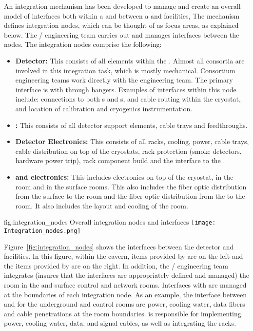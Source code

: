 An integration mechanism has been developed to manage and create an
overall model of interfaces both within a  and
between a  and facilities, The mechanism defines
integration nodes, which can be thought of as focus areas, as
explained below.  The / engineering team carries out and
manages interfaces between the nodes. The integration nodes comprise the following:
\begin{itemize}
\item {\bf Detector:} This consists of all  elements within
  the . Almost all consortia are involved in this
  integration task, which is mostly mechanical. Consortium engineering
  teams work directly with the  engineering team.  The
  primary interface is with  through hangers. Examples of
  interfaces within this node include:  connections to both
  s and s,  and  cable
  routing within the cryostat, and location of calibration and
  cryogenics instrumentation.
\item {\bf {}:} This consists of all detector support elements,
  cable trays and feedthroughs.
\item {\bf Detector Electronics:} This consists of all racks, cooling,
  power, cable trays, cable distribution on top of the cryostats, rack
  protection (smoke detectors, hardware power trip), rack component
  build and the interface to the .
\item {\bf {} and electronics:} This includes electronics on
  top of the cryostat, in the  room and in the surface
  rooms. This also includes the fiber optic distribution from the
  surface to the  room and the fiber optic distribution
  from the  to the  room. It also includes the
  layout and cooling of the  room.
\end{itemize}

\begin{dunefigure}{fig:integration_nodes}
  {Overall integration nodes and interfaces}
  \texttt{[image: Integration\_nodes.png]}
\end{dunefigure}
Figure~\ref{fig:integration_nodes} shows the interfaces between the
detector and facilities. In this figure, within the cavern, items
provided by  are on the left and the items provided by
 are on the right. In addition, the / engineering
team integrates (insures that the interfaces are appropriately defined
and managed) the  room in the  and surface
control and network rooms. Interfaces with 
are managed at the boundaries of each integration node. As an example,
the interface between  and  for the
underground  and control rooms are power, cooling water,
data fibers and cable penetrations at the room
boundaries.  is responsible for implementing power,
cooling water, data, and signal cables, as well as integrating the
racks.


